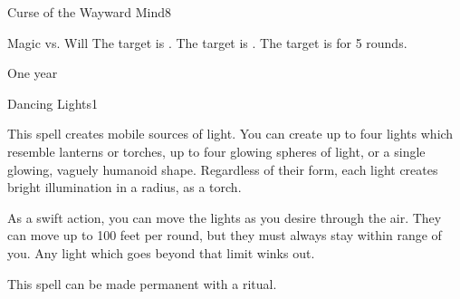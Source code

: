 \begin{spellsection}{Curse of the Wayward Mind}{8}
\begin{spellheader}
\end{spellheader}
\begin{spellcontent}
    \begin{spelltargetinginfo}
    \end{spelltargetinginfo}
    \begin{spelleffects}
        \begin{spellattack}{Magic vs. Will}
            \spellsuccess The target is \disoriented.
            \spellcritical The target is \confused.
            \spellfailure The target is \disoriented for 5 rounds.
        \end{spellattack}
        \spelldur One year
    \end{spelleffects}
\end{spellcontent}
\begin{spellfooter}
    \spellnotes \cursespellnotes
\end{spellfooter}

\begin{comment}
\subsubsection{D}
\end{comment}
\end{spellsection}

\begin{spellsection}{Dancing Lights}{1}
\begin{spellheader}
\end{spellheader}
\begin{spellcontent}
    \begin{spelltargetinginfo}
        \spellrng{\rngmed}
    \end{spelltargetinginfo}
    \begin{spelleffects}
        \spelleffect This spell creates mobile sources of light. You can create up to four lights which resemble lanterns or torches, up to four glowing spheres of light, or a single glowing, vaguely humanoid shape. Regardless of their form, each light creates bright illumination in a \areamed radius, as a torch.

        As a swift action, you can move the lights as you desire through the air. They can move up to 100 feet per round, but they must always stay within range of you. Any light which goes beyond that limit winks out.
        \spelldur \durshort \dismissable
    \end{spelleffects}
\end{spellcontent}
\begin{spellfooter}
    \spellnotes This spell can be made permanent with a  ritual.
\end{spellfooter}
\end{spellsection}


